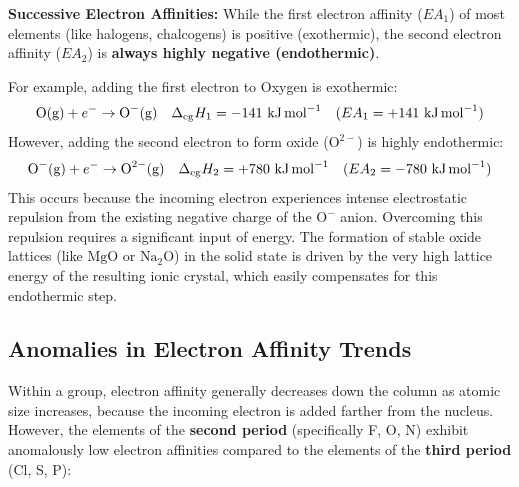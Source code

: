 \documentclass[12pt,a4paper]{article}
\begin{document}
\textbf{Successive Electron Affinities:}
While the first electron affinity ($EA_1$) of most elements (like halogens, chalcogens) is positive (exothermic), the second electron affinity ($EA_2$) is \textbf{always highly negative (endothermic)}.
\par
For example, adding the first electron to Oxygen is exothermic:
\[ \text{O(g)} + e^- \to \text{O}^-\text{(g)} \quad \Delta_{\text{eg}}H_1 = -141\ \text{kJ\,mol}^{-1} \quad (EA_1 = +141\ \text{kJ\,mol}^{-1}) \]
However, adding the second electron to form oxide ($\text{O}^{2-}$) is highly endothermic:
\[ \text{O}^-\text{(g)} + e^- \to \text{O}^{2-}\text{(g)} \quad \Delta_{\text{eg}}H_2 = +780\ \text{kJ\,mol}^{-1} \quad (EA_2 = -780\ \text{kJ\,mol}^{-1}) \]
This occurs because the incoming electron experiences intense electrostatic repulsion from the existing negative charge of the $\text{O}^-$ anion. Overcoming this repulsion requires a significant input of energy. The formation of stable oxide lattices (like $\text{MgO}$ or $\text{Na}_2\text{O}$) in the solid state is driven by the very high lattice energy of the resulting ionic crystal, which easily compensates for this endothermic step.

\subsection{Anomalies in Electron Affinity Trends}
Within a group, electron affinity generally decreases down the column as atomic size increases, because the incoming electron is added farther from the nucleus. However, the elements of the \textbf{second period} (specifically F, O, N) exhibit anomalously low electron affinities compared to the elements of the \textbf{third period} (Cl, S, P):
\end{document}
